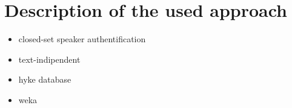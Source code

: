 \section{Description of the used approach}


\begin{itemize}
	\item closed-set speaker authentification
	\item text-indipendent
	\item hyke database
	\item weka
\end{itemize}


